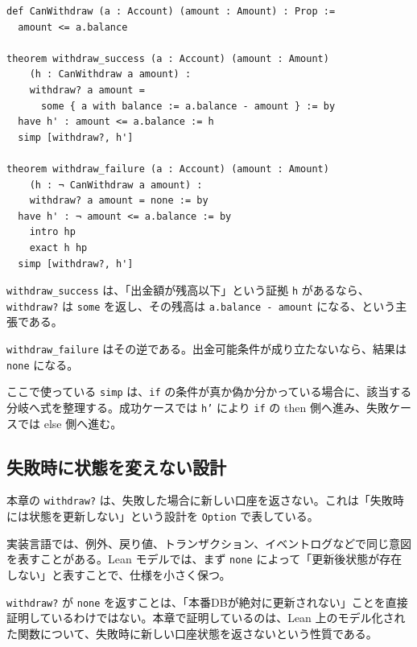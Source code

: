 \begin{listing}[htbp]
\begin{verbatim}
def CanWithdraw (a : Account) (amount : Amount) : Prop :=
  amount <= a.balance

theorem withdraw_success (a : Account) (amount : Amount)
    (h : CanWithdraw a amount) :
    withdraw? a amount =
      some { a with balance := a.balance - amount } := by
  have h' : amount <= a.balance := h
  simp [withdraw?, h']

theorem withdraw_failure (a : Account) (amount : Amount)
    (h : ¬ CanWithdraw a amount) :
    withdraw? a amount = none := by
  have h' : ¬ amount <= a.balance := by
    intro hp
    exact h hp
  simp [withdraw?, h']
\end{verbatim}
\caption{出金可能条件と出金仕様}
\label{lst:ch19-withdraw-proof}
\end{listing}

\texttt{withdraw\_success} は、「出金額が残高以下」という証拠 \texttt{h} があるなら、\texttt{withdraw?} は \texttt{some} を返し、その残高は \texttt{a.balance - amount} になる、という主張である。

\texttt{withdraw\_failure} はその逆である。出金可能条件が成り立たないなら、結果は \texttt{none} になる。

\begin{leanbox}
ここで使っている \texttt{simp} は、\texttt{if} の条件が真か偽か分かっている場合に、該当する分岐へ式を整理する。成功ケースでは \texttt{h'} により \texttt{if} の then 側へ進み、失敗ケースでは else 側へ進む。
\end{leanbox}

\subsection{失敗時に状態を変えない設計}

本章の \texttt{withdraw?} は、失敗した場合に新しい口座を返さない。これは「失敗時には状態を更新しない」という設計を \texttt{Option} で表している。

実装言語では、例外、戻り値、トランザクション、イベントログなどで同じ意図を表すことがある。Lean モデルでは、まず \texttt{none} によって「更新後状態が存在しない」と表すことで、仕様を小さく保つ。

\begin{warningbox}
\texttt{withdraw?} が \texttt{none} を返すことは、「本番DBが絶対に更新されない」ことを直接証明しているわけではない。本章で証明しているのは、Lean 上のモデル化された関数について、失敗時に新しい口座状態を返さないという性質である。
\end{warningbox}

